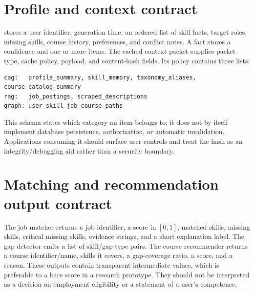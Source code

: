 \section{Profile and context contract}

 stores a user identifier, generation time, an ordered list of skill facts, target roles, missing skills, course history, preferences, and conflict notes. A fact stores a confidence and one or more  items. The cached context packet supplies packet type, cache policy, payload, and content-hash fields. Its policy contains three lists:

\begin{verbatim}
cag:   profile_summary, skill_memory, taxonomy_aliases, course_catalog_summary
rag:   job_postings, scraped_descriptions
graph: user_skill_job_course_paths
\end{verbatim}

This schema states which category an item belongs to; it does not by itself implement database persistence, authorization, or automatic invalidation. Applications consuming it should surface user controls and treat the hash as an integrity/debugging aid rather than a security boundary.

\section{Matching and recommendation output contract}

The job matcher returns a job identifier, a score in $[0,1]$, matched skills, missing skills, critical missing skills, evidence strings, and a short explanation label. The gap detector emits a list of skill/gap-type pairs. The course recommender returns a course identifier/name, skills it covers, a gap-coverage ratio, a score, and a reason. These outputs contain transparent intermediate values, which is preferable to a bare score in a research prototype. They should not be interpreted as a decision on employment eligibility or a statement of a user's competence.
